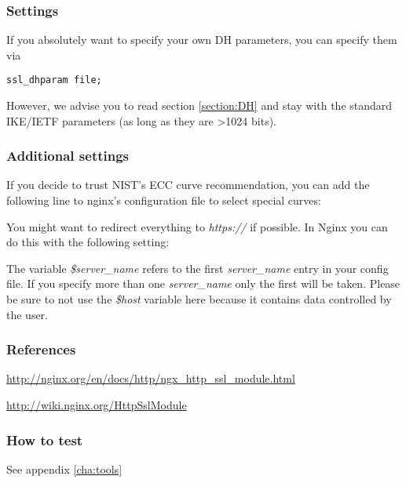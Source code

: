 \subsubsection{Settings}
If you absolutely want to specify your own DH parameters, you can specify them via

\begin{lstlisting}
ssl_dhparam file;
\end{lstlisting}

However, we advise you to read section \ref{section:DH} and stay with the standard IKE/IETF parameters (as long as they are \textgreater 1024 bits).

\subsubsection{Additional settings}
If you decide to trust NIST's ECC curve recommendation, you can add the following line to nginx's configuration file to select special curves:


You might want to redirect everything to \emph{https://} if possible. In Nginx you can do this with the following setting:


The variable \emph{\$server\_name} refers to the first \emph{server\_name} entry in your config file. If you specify more than one \emph{server\_name} only the first will be taken. Please be sure to not use the \emph{\$host} variable here because it contains data controlled by the user.

\subsubsection{References}
\begin{itemize*}
  \item \url{http://nginx.org/en/docs/http/ngx_http_ssl_module.html}
  \item \url{http://wiki.nginx.org/HttpSslModule}
\end{itemize*}

\subsubsection{How to test}
See appendix \ref{cha:tools}


